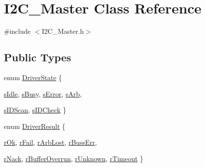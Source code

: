 \hypertarget{class_i2_c___master}{
\section{I2C\_\-Master Class Reference}
\label{class_i2_c___master}
}


{\ttfamily \#include $<$I2C\_\-Master.h$>$}

\subsection*{Public Types}
\begin{DoxyCompactItemize}
\item 
enum \hyperlink{class_i2_c___master_aaa6720f57770cfe755cb3d6dfc665cfa}{DriverState} \{ \par
\hyperlink{class_i2_c___master_aaa6720f57770cfe755cb3d6dfc665cfaa106aa4b7a5940d89eb0414d4419b7252}{sIdle}, 
\hyperlink{class_i2_c___master_aaa6720f57770cfe755cb3d6dfc665cfaab58465e81001fa18fb18c0d575767f7e}{sBusy}, 
\hyperlink{class_i2_c___master_aaa6720f57770cfe755cb3d6dfc665cfaad6c2f557ff2a47e40ee8061d03be3f93}{sError}, 
\hyperlink{class_i2_c___master_aaa6720f57770cfe755cb3d6dfc665cfaa41c5bf228154f500d9197840312b463a}{sArb}, 
\par
\hyperlink{class_i2_c___master_aaa6720f57770cfe755cb3d6dfc665cfaa970ed8159f92e1649d52945f3fe9fa42}{sIDScan}, 
\hyperlink{class_i2_c___master_aaa6720f57770cfe755cb3d6dfc665cfaae3c5c4fcc4da0df6dd866b32cd5f9184}{sIDCheck}
 \}
\item 
enum \hyperlink{class_i2_c___master_aff65d5186eee9d33563619432439cb53}{DriverResult} \{ \par
\hyperlink{class_i2_c___master_aff65d5186eee9d33563619432439cb53a7dae97140a932eb04e7635a82410d01a}{rOk}, 
\hyperlink{class_i2_c___master_aff65d5186eee9d33563619432439cb53a3349653f86b539abedde983ec058ce53}{rFail}, 
\hyperlink{class_i2_c___master_aff65d5186eee9d33563619432439cb53a023a5a4f20d8a675a5a6e34bbd0fc604}{rArbLost}, 
\hyperlink{class_i2_c___master_aff65d5186eee9d33563619432439cb53a81be58e3f6f6d9163ca90015b05d5fd4}{rBussErr}, 
\par
\hyperlink{class_i2_c___master_aff65d5186eee9d33563619432439cb53a18ea143f7ebbd2b621932e7f92247766}{rNack}, 
\hyperlink{class_i2_c___master_aff65d5186eee9d33563619432439cb53a09fccc41550be0f8eb95f6d309d8544a}{rBufferOverrun}, 
\hyperlink{class_i2_c___master_aff65d5186eee9d33563619432439cb53a72ca41d27dd6cb0c1a992deb9880edf6}{rUnknown}, 
\hyperlink{class_i2_c___master_aff65d5186eee9d33563619432439cb53a95b91cb8ec3040830ebcc159e50774c6}{rTimeout}
 \}
\end{DoxyCompactItemize}
